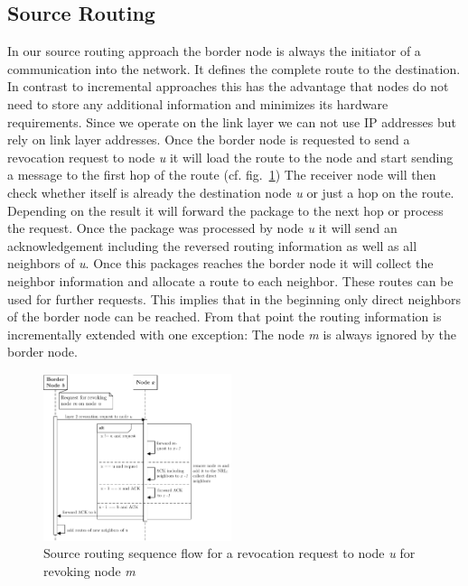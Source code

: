 \documentclass[conference]{IEEEtran}
\begin{document}
\subsection{Source Routing}\label{sec:approach:source_routing}
In our source routing approach the border node is always the initiator of a communication into the network. 
It defines the complete route to the destination.
In contrast to incremental approaches this has the advantage that nodes do not need to store any additional information and minimizes its hardware requirements.
Since we operate on the link layer we can not use IP addresses but rely on link layer addresses.
Once the border node is requested to send a revocation request to node \textit{u} it will load the route to the node and start sending a message to the first hop of the route (cf. fig.~\ref{fig:source_routing_sequence})
The receiver node will then check whether itself is already the destination node \textit{u} or just a hop on the route.
Depending on the result it will forward the package to the next hop or process the request.
Once the package was processed by node \textit{u} it will send an acknowledgement including the reversed routing information as well as all neighbors of \textit{u}.
Once this packages reaches the border node it will collect the neighbor information and allocate a route to each neighbor.
These routes can be used for further requests.
This implies that in the beginning only direct neighbors of the border node can be reached.
From that point the routing information is incrementally extended with one exception: The node \textit{m} is always ignored by the border node.
\begin{figure}[t]
	\centering
	\includegraphics[width=0.49\textwidth]{source_routing_sequence}
	\caption{Source routing sequence flow for a revocation request to node \textit{u} for revoking node \textit{m}}
	\label{fig:source_routing_sequence}
\end{figure}
\end{document}
